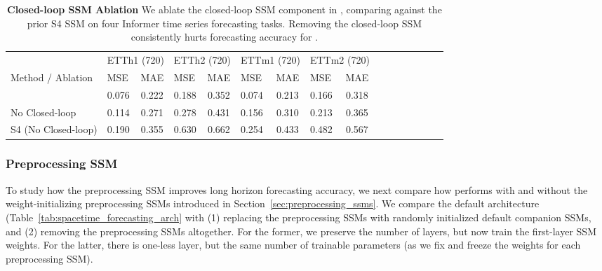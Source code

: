 \begin{table}[H]
    \centering
    \caption{ \textbf{Closed-loop SSM Ablation} We ablate the closed-loop SSM component in \ourmethod{}, comparing against the prior S4 SSM on four Informer time series forecasting tasks. Removing the closed-loop SSM consistently hurts forecasting accuracy for \ourmethod{}. }
    \label{tab:ablation_results_closed_loop_ssm}
    \begin{tabular}{@{}lbcbcbcbc@{}}
\toprule
                            & \multicolumn{2}{c}{ETTh1 (720)} & \multicolumn{2}{c}{ETTh2 (720)} & \multicolumn{2}{c}{ETTm1 (720)} & \multicolumn{2}{c}{ETTm2 (720)} \\ \cmidrule(l){2-9} 
Method / Ablation                      & MSE            & MAE            & MSE            & MAE            & MSE            & MAE            & MSE            & MAE            \\ \midrule
\ourmethod{}                & 0.076          & 0.222          & 0.188          & 0.352          & 0.074          & 0.213          & 0.166          & 0.318          \\
\ourmethod{} No Closed-loop & 0.114          & 0.271          & 0.278          & 0.431          & 0.156          & 0.310          & 0.213          & 0.365          \\
S4 (No Closed-loop)         & 0.190          & 0.355          & 0.630          & 0.662          & 0.254          & 0.433          & 0.482          & 0.567          \\ \bottomrule
\end{tabular}
    
\end{table}

\subsubsection{Preprocessing SSM}\label{appendix:ablations_preprocessing_ssm}

To study how the preprocessing SSM improves long horizon forecasting accuracy, we next compare how \ourmethod{} performs with and without the weight-initializing preprocessing SSMs introduced in Section~\ref{sec:preprocessing_ssms}. We compare the default \ourmethod{} architecture (Table~\ref{tab:spacetime_forecasting_arch} with (1) replacing the preprocessing SSMs with randomly initialized default companion SSMs, and (2) removing the preprocessing SSMs altogether. For the former, we preserve the number of layers, but now train the first-layer SSM weights. For the latter, there is one-less layer, but the same number of trainable parameters (as we fix and freeze the weights for each preprocessing SSM). 


